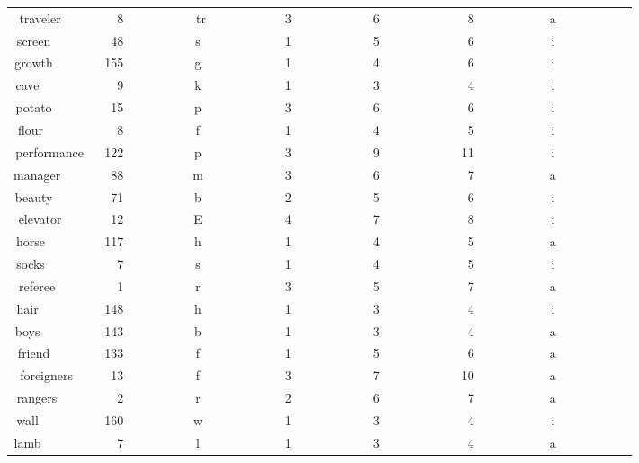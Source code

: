 \begin{longtable}{|c|c|c|c|c|c|c|}
traveler~~~~&~~8~~~~~~~~~&tr~~~~~~~~~~&3~~~~~~~~~~~&6~~~~~~~~~~~&~8~~~~~~~~~~&a~~~~~~~~~~~\\ 
screen~~~~~~&~48~~~~~~~~~&s~~~~~~~~~~~&1~~~~~~~~~~~&5~~~~~~~~~~~&~6~~~~~~~~~~&i~~~~~~~~~~~\\ 
growth~~~~~~&155~~~~~~~~~&g~~~~~~~~~~~&1~~~~~~~~~~~&4~~~~~~~~~~~&~6~~~~~~~~~~&i~~~~~~~~~~~\\ 
cave~~~~~~~~&~~9~~~~~~~~~&k~~~~~~~~~~~&1~~~~~~~~~~~&3~~~~~~~~~~~&~4~~~~~~~~~~&i~~~~~~~~~~~\\ 
potato~~~~~~&~15~~~~~~~~~&p~~~~~~~~~~~&3~~~~~~~~~~~&6~~~~~~~~~~~&~6~~~~~~~~~~&i~~~~~~~~~~~\\ 
flour~~~~~~~&~~8~~~~~~~~~&f~~~~~~~~~~~&1~~~~~~~~~~~&4~~~~~~~~~~~&~5~~~~~~~~~~&i~~~~~~~~~~~\\ 
performance~&122~~~~~~~~~&p~~~~~~~~~~~&3~~~~~~~~~~~&9~~~~~~~~~~~&11~~~~~~~~~~&i~~~~~~~~~~~\\ 
manager~~~~~&~88~~~~~~~~~&m~~~~~~~~~~~&3~~~~~~~~~~~&6~~~~~~~~~~~&~7~~~~~~~~~~&a~~~~~~~~~~~\\ 
beauty~~~~~~&~71~~~~~~~~~&b~~~~~~~~~~~&2~~~~~~~~~~~&5~~~~~~~~~~~&~6~~~~~~~~~~&i~~~~~~~~~~~\\ 
elevator~~~~&~12~~~~~~~~~&E~~~~~~~~~~~&4~~~~~~~~~~~&7~~~~~~~~~~~&~8~~~~~~~~~~&i~~~~~~~~~~~\\ 
horse~~~~~~~&117~~~~~~~~~&h~~~~~~~~~~~&1~~~~~~~~~~~&4~~~~~~~~~~~&~5~~~~~~~~~~&a~~~~~~~~~~~\\ 
socks~~~~~~~&~~7~~~~~~~~~&s~~~~~~~~~~~&1~~~~~~~~~~~&4~~~~~~~~~~~&~5~~~~~~~~~~&i~~~~~~~~~~~\\ 
referee~~~~~&~~1~~~~~~~~~&r~~~~~~~~~~~&3~~~~~~~~~~~&5~~~~~~~~~~~&~7~~~~~~~~~~&a~~~~~~~~~~~\\ 
hair~~~~~~~~&148~~~~~~~~~&h~~~~~~~~~~~&1~~~~~~~~~~~&3~~~~~~~~~~~&~4~~~~~~~~~~&i~~~~~~~~~~~\\ 
boys~~~~~~~~&143~~~~~~~~~&b~~~~~~~~~~~&1~~~~~~~~~~~&3~~~~~~~~~~~&~4~~~~~~~~~~&a~~~~~~~~~~~\\ 
friend~~~~~~&133~~~~~~~~~&f~~~~~~~~~~~&1~~~~~~~~~~~&5~~~~~~~~~~~&~6~~~~~~~~~~&a~~~~~~~~~~~\\ 
foreigners~~&~13~~~~~~~~~&f~~~~~~~~~~~&3~~~~~~~~~~~&7~~~~~~~~~~~&10~~~~~~~~~~&a~~~~~~~~~~~\\ 
rangers~~~~~&~~2~~~~~~~~~&r~~~~~~~~~~~&2~~~~~~~~~~~&6~~~~~~~~~~~&~7~~~~~~~~~~&a~~~~~~~~~~~\\ 
wall~~~~~~~~&160~~~~~~~~~&w~~~~~~~~~~~&1~~~~~~~~~~~&3~~~~~~~~~~~&~4~~~~~~~~~~&i~~~~~~~~~~~\\ 
lamb~~~~~~~~&~~7~~~~~~~~~&l~~~~~~~~~~~&1~~~~~~~~~~~&3~~~~~~~~~~~&~4~~~~~~~~~~&a~~~~~~~~~~~\\ 

\end{longtable}
